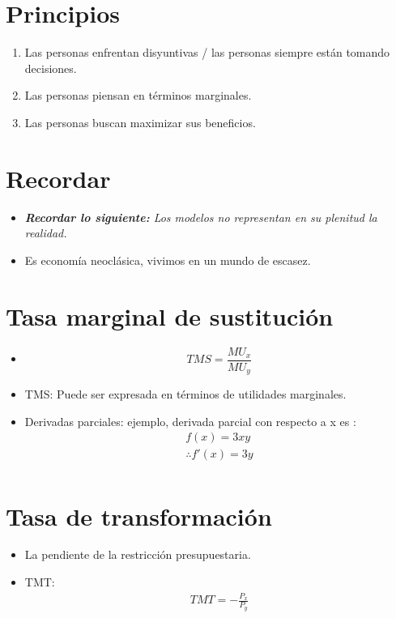 \section{Principios}
\begin{enumerate}
    \item Las personas enfrentan disyuntivas / las personas siempre están tomando decisiones.
    \item Las personas piensan en términos marginales.
    \item Las personas buscan maximizar sus beneficios.
\end{enumerate}


\section{Recordar}
\begin{itemize}
    \item \emph{\textbf{Recordar lo siguiente: }Los modelos no representan en su plenitud la realidad.}
    \item Es economía neoclásica, vivimos en un mundo de escasez.
\end{itemize}


\section{Tasa marginal de sustitución}
\begin{itemize}
    \item \[
        TMS = \frac{MU_x}{MU_y} 
      \]
    
    \item TMS: Puede ser expresada en términos de utilidades marginales.
    \item Derivadas parciales: ejemplo, derivada parcial con respecto a x es :     
        \begin{align*}
            f(x) = 3x y \\ 
            \therefore f'(x) = 3y \\ 
        \end{align*}
\end{itemize}


\section{Tasa de transformación}
\begin{itemize}
    \item La pendiente de la restricción presupuestaria.
    \item TMT:
        \begin{align*}
            TMT = -\frac{P_x}{P_y} \\ 
        \end{align*}
\end{itemize}


